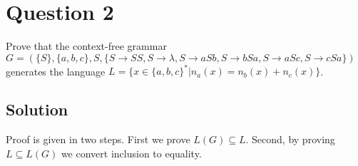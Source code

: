 
\section*{Question 2}

Prove that the context-free grammar $ G = (\{S\},\{a,b,c\},S,\{S\rightarrow SS, S\rightarrow \lambda, S\rightarrow aSb, S\rightarrow bSa, S\rightarrow aSc, S\rightarrow cSa\}) $
generates the language $ L = \{x \in \{a,b,c\}^* | n_a(x) = n_b(x) + n_c(x) \}$.

\subsection*{Solution}

Proof is given in two steps. First we prove $L(G) \subseteq L$. Second, by proving $L \subseteq L(G)$ we convert inclusion to equality.

